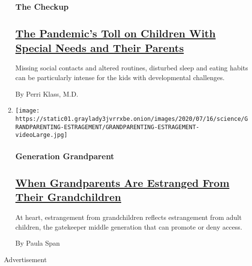 \begin{enumerate}
  \hypertarget{the-checkup}{%
  \subsubsection{The Checkup}\label{the-checkup}}

  \hypertarget{the-pandemics-toll-on-children-with-special-needs-and-their-parents}{%
  \subsection{\texorpdfstring{\href{/2020/07/27/well/family/children-special-needs-pandemic.html}{The
  Pandemic's Toll on Children With Special Needs and Their
  Parents}}{The Pandemic's Toll on Children With Special Needs and Their Parents}}\label{the-pandemics-toll-on-children-with-special-needs-and-their-parents}}

  Missing social contacts and altered routines, disturbed sleep and
  eating habits can be particularly intense for the kids with
  developmental challenges.

  By Perri Klass, M.D.
\item
  \texttt{[image: https://static01.graylady3jvrrxbe.onion/images/2020/07/16/science/GRANDPARENTING-ESTRAGEMENT/GRANDPARENTING-ESTRAGEMENT-videoLarge.jpg]}

  \hypertarget{generation-grandparent}{%
  \subsubsection{Generation Grandparent}\label{generation-grandparent}}

  \hypertarget{when-grandparents-are-estranged-from-their-grandchildren}{%
  \subsection{\texorpdfstring{\href{/2020/07/23/well/family/estrangement-grandparents-grandchildren.html}{When
  Grandparents Are Estranged From Their
  Grandchildren}}{When Grandparents Are Estranged From Their Grandchildren}}\label{when-grandparents-are-estranged-from-their-grandchildren}}

  At heart, estrangement from grandchildren reflects estrangement from
  adult children, the gatekeeper middle generation that can promote or
  deny access.

  By Paula Span
\end{enumerate}

Advertisement

